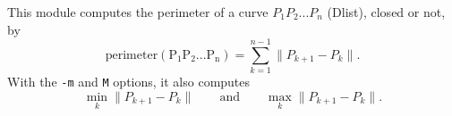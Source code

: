 This module computes the perimeter of a curve $P_1P_2...P_n$ (Dlist),
closed or not, by
$$\mathrm{perimeter(P_1P_2...P_n)} = \sum_{k=1}^{n-1} \|P_{k+1}-P_k\|.$$
With the \verb+-m+ and \verb+M+ options, it also computes
$$\min_k \|P_{k+1}-P_k\| \qquad \mathrm{and} \qquad
\max_k \|P_{k+1}-P_k\|.$$